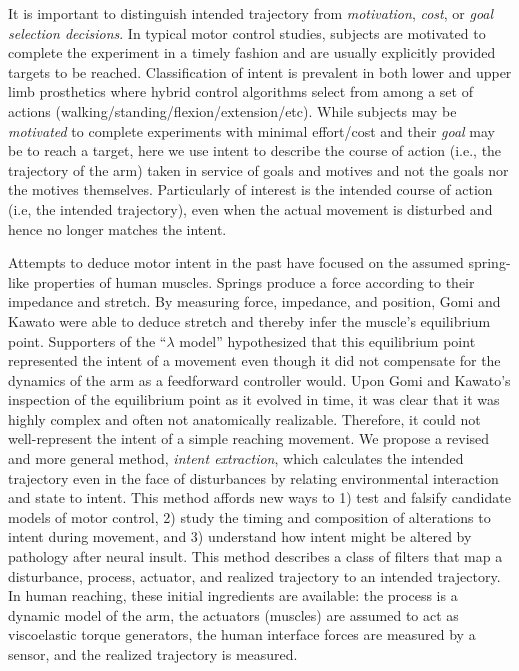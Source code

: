 \documentclass[10pt]{article}
\begin{document}
It is important to distinguish intended trajectory from \textit{motivation}\cite{mcclelland1985motives, rawolle2013relationships}, \textit{cost}\cite{todorov2002optimal, flash1985coordination}, or \textit{goal selection decisions}\cite{ziebart2010modeling}. In typical motor control studies, subjects are motivated to complete the experiment in a timely fashion and are usually explicitly provided targets to be reached. Classification of intent is prevalent in both lower \cite{strausser2011development, hargrove2013robotic} and upper limb\cite{englehart2003robust, young2012improving} prosthetics where hybrid control algorithms select from among a set of actions (walking/standing/flexion/extension/etc). While subjects may be \textit{motivated} to complete experiments with minimal effort/cost and their \textit{goal} may be to reach a target, here we use intent to describe the course of action (i.e., the trajectory of the arm) taken in service of goals and motives and not the goals nor the motives themselves. Particularly of interest is the intended course of action (i.e, the intended trajectory), even when the actual movement is disturbed and hence no longer matches the intent.

Attempts to deduce motor intent in the past have focused on the assumed spring-like properties of human muscles. Springs produce a force according to their impedance and stretch. By measuring force, impedance, and position, Gomi and Kawato\cite{gomi1997human} were able to deduce stretch and thereby infer the muscle's equilibrium point. Supporters of the ``$\lambda$ model''\cite{feldman1995origin} hypothesized that this equilibrium point represented the intent of a movement even though it did not compensate for the dynamics of the arm as a feedforward controller would. Upon Gomi and Kawato's inspection of the equilibrium point as it evolved in time, it was clear that it was highly complex and often not anatomically realizable. Therefore, it could not well-represent the intent of a simple reaching movement. We propose a revised and more general method, \textit{intent extraction}, which calculates the intended trajectory even in the face of disturbances by relating environmental interaction and state to intent. This method affords new ways to 1) test and falsify candidate models of motor control, 2) study the timing and composition of alterations to intent during movement, and 3) understand how intent might be altered by pathology after neural insult. This method describes a class of filters that map a disturbance, process, actuator, and realized trajectory to an intended trajectory. In human reaching, these initial ingredients are available: the process is a dynamic model of the arm, the actuators (muscles) are assumed to act as viscoelastic torque generators, the human interface forces are measured by a sensor, and the realized trajectory is measured.
\end{document}
